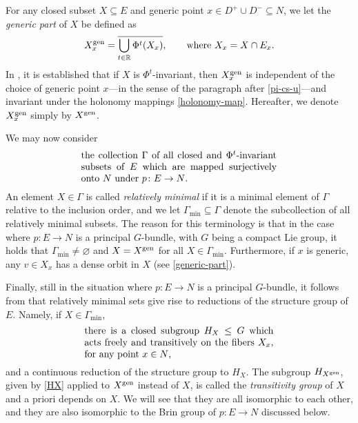 \documentclass[pdftex]{sigma}
\newcommand{\R}{\mathbb{R}}
\numberwithin{equation}{section}
\theoremstyle{definition}
\begin{document}
For any closed subset $X\subseteq E$ and generic point $x\in D^+\cup D^-\subseteq N$, we let the \emph{generic part} of $X$ be defined as
\begin{equation}\label{generic-part}
 X^{\rm gen}_x = \overline{\bigcup_{t\in \R} \Phi^t(X_x)},\qquad \mbox{where } X_x = X \cap E_x.
\end{equation}In \cite[Proposition 2.2.10]{filip2024finiteness}, it is established that if $X$ is $\Phi^t$-invariant, then $X^{\rm gen}_x$ is independent of the choice of generic point $x$---in the sense of the paragraph after \eqref{pi-cs-u}---and invariant under the holonomy mappings \eqref{holonomy-map}. Hereafter, we denote $X^{\rm gen}_x$ simply by $X^{\rm gen}$.

We may now consider \begin{equation}\label{defn-Gamma}
 \parbox{.59\textwidth}{the collection $\Gamma$ of all closed and $\Phi^t$-invariant subsets of $E$ which are mapped surjectively onto $N$ under $p\colon E\to N$.}
\end{equation} An element $X\in \Gamma$ is called \emph{relatively minimal} if it is a minimal element of $\Gamma$ relative to the inclusion order, and we let $\Gamma_{\min}\subseteq \Gamma$ denote the subcollection of all relatively minimal subsets. The reason for this terminology is that in the case where $p\colon E\to N$ is a principal $G$-bundle, with $G$ being a compact Lie group, it holds that $\Gamma_{\min}\neq \varnothing$ and $X = X^{\rm gen}$ for all $X\in \Gamma_{\min}$. Furthermore, if $x$ is generic, any $v\in X_x$ has a dense orbit in $X$ (see \eqref{generic-part}).

Finally, still in the situation where $p\colon E\to N$ is a principal $G$-bundle, it follows from \cite[Propositions 2.2.16 and 2.2.18 and Corollary 2.2.17]{filip2024finiteness} that relatively minimal sets give rise to reductions of the structure group of $E$. Namely, if $X\in \Gamma_{\min}$,
\begin{equation}\label{HX}
 \parbox{.57\textwidth}{there is a closed subgroup $H_X\leq G$ which acts freely and transitively on the fibers $X_x$, for any point $x\in N$,}
\end{equation}and a continuous reduction of the structure group to $H_X$. The subgroup $H_{X^{\rm gen}}$, given by \eqref{HX} applied to $X^{\rm gen}$ instead of $X$, is called the \emph{transitivity group} of $X$ and a priori depends on $X$. We will see that they are all isomorphic to each other, and they are also isomorphic to the Brin group of $p\colon E\to N$ discussed below.
\end{document}
